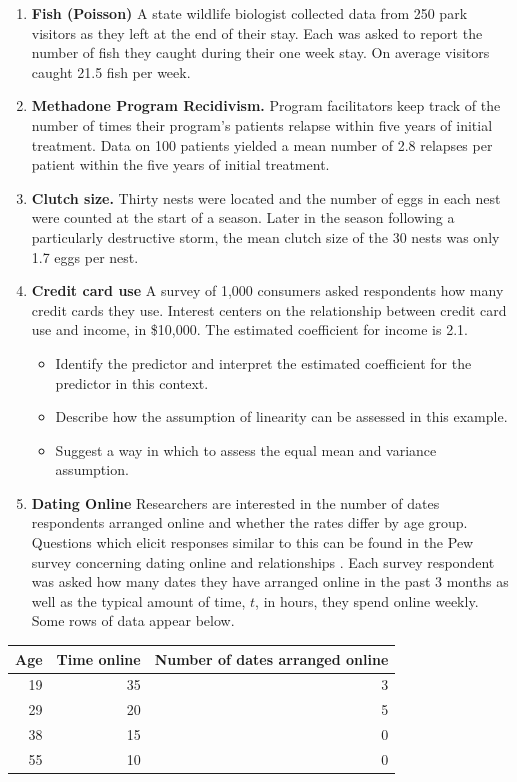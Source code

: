 \documentclass[
]{krantz}
\providecommand{\tightlist}{%
  \setlength{\itemsep}{0pt}\setlength{\parskip}{0pt}}
\begin{document}
\begin{enumerate}
\def\labelenumi{\arabic{enumi}.}
\setcounter{enumi}{10}
\item
  \textbf{Fish (Poisson)} A state wildlife biologist collected data from 250 park visitors as they left at the end of their stay. Each was asked to report the number of fish they caught during their one week stay. On average visitors caught 21.5 fish per week.
\item
  \textbf{Methadone Program Recidivism.} Program facilitators keep track of the number of times their program's patients relapse within five years of initial treatment. Data on 100 patients yielded a mean number of 2.8 relapses per patient within the five years of initial treatment.
\item
  \textbf{Clutch size.} Thirty nests were located and the number of eggs in each nest were counted at the start of a season. Later in the season following a particularly destructive storm, the mean clutch size of the 30 nests was only 1.7 eggs per nest.
\item
  \textbf{Credit card use} A survey of 1,000 consumers asked respondents how many credit cards they use. Interest centers on the relationship between credit card use and income, in \$10,000. The estimated coefficient for income is 2.1.

  \begin{itemize}
  \tightlist
  \item
    Identify the predictor and interpret the estimated coefficient for the predictor in this context.
  \item
    Describe how the assumption of linearity can be assessed in this example.
  \item
    Suggest a way in which to assess the equal mean and variance assumption.
  \end{itemize}
\item
  \textbf{Dating Online} Researchers are interested in the number of dates respondents arranged online and whether the rates differ by age group. Questions which elicit responses similar to this can be found in the Pew survey concerning dating online and relationships \citep{Duggan2013}. Each survey respondent was asked how many dates they have arranged online in the past 3 months as well as the typical amount of time, \(t\), in hours, they spend online weekly. Some rows of data appear below.
\end{enumerate}

\begin{tabular}{r|r|r}
\hline
Age & Time online & Number of dates arranged online\\
\hline
19 & 35 & 3\\
\hline
29 & 20 & 5\\
\hline
38 & 15 & 0\\
\hline
55 & 10 & 0\\
\hline
\end{tabular}
\end{document}
